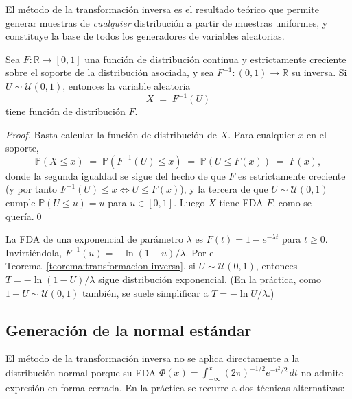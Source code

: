 El método de la transformación inversa es el resultado teórico que permite generar muestras de \emph{cualquier} distribución a partir de muestras uniformes, y constituye la base de todos los generadores de variables aleatorias.

\begin{teorema}
\label{teorema:transformacion-inversa}
Sea $F: \mathbb{R} \to [0,1]$ una función de distribución continua y estrictamente creciente sobre el soporte de la distribución asociada, y sea $F^{-1}: (0,1) \to \mathbb{R}$ su inversa. Si $U \sim \mathcal{U}(0,1)$, entonces la variable aleatoria
\[
    X \;=\; F^{-1}(U)
\]
tiene función de distribución $F$.
\end{teorema}

\begin{proof}
Basta calcular la función de distribución de $X$. Para cualquier $x$ en el soporte,
\[
    \mathbb{P}(X \leq x)
    \;=\; \mathbb{P}\!\left(F^{-1}(U) \leq x\right)
    \;=\; \mathbb{P}\!\left(U \leq F(x)\right)
    \;=\; F(x),
\]
donde la segunda igualdad se sigue del hecho de que $F$ es estrictamente creciente (y por tanto $F^{-1}(U) \leq x \iff U \leq F(x)$), y la tercera de que $U \sim \mathcal{U}(0,1)$ cumple $\mathbb{P}(U \leq u) = u$ para $u \in [0,1]$. Luego $X$ tiene FDA $F$, como se quería.\qed
\end{proof}

\begin{ejemplo}
\label{ej:exp-inversa}
La FDA de una exponencial de parámetro $\lambda$ es $F(t) = 1 - e^{-\lambda t}$ para $t \geq 0$. Invirtiéndola, $F^{-1}(u) = -\ln(1-u)/\lambda$. Por el Teorema~\ref{teorema:transformacion-inversa}, si $U \sim \mathcal{U}(0,1)$, entonces $T = -\ln(1-U)/\lambda$ sigue distribución exponencial. (En la práctica, como $1 - U \sim \mathcal{U}(0,1)$ también, se suele simplificar a $T = -\ln U / \lambda$.)
\end{ejemplo}

\subsection{Generación de la normal estándar}
\label{subsec:generacion-normal}

El método de la transformación inversa no se aplica directamente a la distribución normal porque su FDA $\Phi(x) = \int_{-\infty}^{x}(2\pi)^{-1/2}e^{-t^2/2}\,dt$ no admite expresión en forma cerrada. En la práctica se recurre a dos técnicas alternativas:

